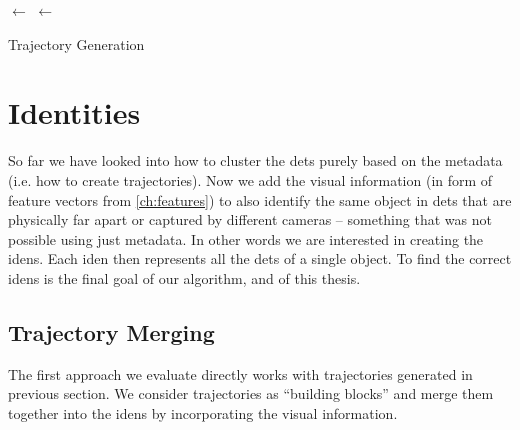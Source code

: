 \begin{algorithm}

 
 \BlankLine
 \Traj $\leftarrow$ \UnionFind{ }\;
 \Win $\leftarrow$ \Queue{ }\;
 \Return \Traj

 \caption{Trajectory Generation}
 \label{alg:trajectory_generation}
\end{algorithm}

\section{Identities}

\label{sec:generating_identities}

So far we have looked into how to cluster the \glspl{det} purely based on the metadata (i.e. how to create trajectories). Now we add the visual information (in form of feature vectors from \autoref{ch:features}) to also identify the same object in \glspl{det} that are physically far apart or captured by different cameras -- something that was not possible using just metadata. In other words we are interested in creating the \glspl{iden}. Each \gls{iden} then represents all the \glspl{det} of a single object. To find the correct \glspl{iden} is the final goal of our algorithm, and of this thesis.

\subsection{Trajectory Merging}

The first approach we evaluate directly works with trajectories generated in previous section. We consider trajectories as ``building blocks'' and merge them together into the \glspl{iden} by incorporating the visual information.

